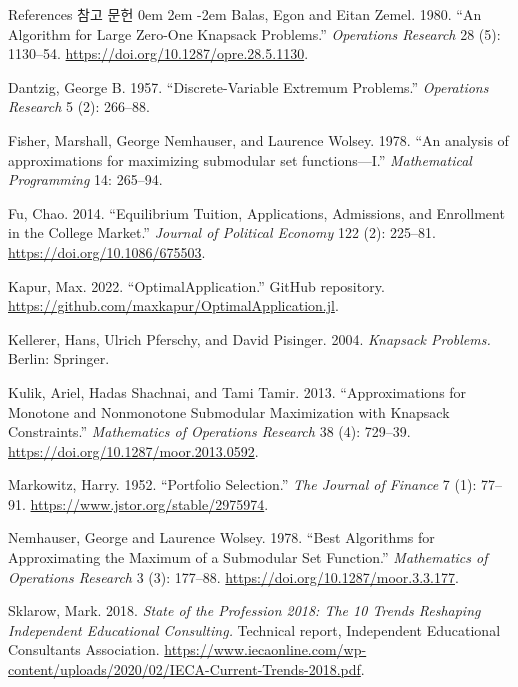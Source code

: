 \documentclass[11pt,mathserif,notheorems]{beamer}
\theoremstyle{definition}
\theoremstyle{definition}
\begin{document}
\begin{frame}[allowframebreaks]{\ifen References \else 참고 문헌 \fi}
\parskip 0em
\leftskip 2em
\parindent -2em
Balas, Egon and Eitan Zemel. 1980. ``An Algorithm for Large Zero-One Knapsack Problems.'' \emph{Operations Research} 28 (5): 1130--54. \url{https://doi.org/10.1287/opre.28.5.1130}. 

Dantzig, George B. 1957. ``Discrete-Variable Extremum Problems.'' \emph{Operations Research} 5 (2): 266--88.

Fisher, Marshall, George Nemhauser, and Laurence Wolsey. 1978. ``An analysis of approximations for maximizing submodular set functions—I.'' \emph{Mathematical Programming} 14: 265--94. 

Fu, Chao. 2014. ``Equilibrium Tuition, Applications, Admissions, and Enrollment in the College Market.'' \emph{Journal of Political Economy} 122 (2): 225--81. \url{https://doi.org/10.1086/675503}. 

Kapur, Max. 2022. ``OptimalApplication.'' GitHub repository. \url{https://github.com/maxkapur/OptimalApplication.jl}.


\framebreak

Kellerer, Hans, Ulrich Pferschy, and David Pisinger. 2004. \emph{Knapsack Problems.} Berlin: Springer.

Kulik, Ariel, Hadas Shachnai, and Tami Tamir. 2013. ``Approximations for Monotone and Nonmonotone Submodular Maximization with Knapsack Constraints.'' \emph{Mathematics of Operations Research} 38 (4): 729--39. \url{https://doi.org/10.1287/moor.2013.0592}.

Markowitz, Harry. 1952. ``Portfolio Selection.'' \emph{The Journal of Finance} 7 (1): 77--91. \url{https://www.jstor.org/stable/2975974}.

Nemhauser, George and Laurence Wolsey. 1978. ``Best Algorithms for Approximating the Maximum of a Submodular Set Function.'' \emph{Mathematics of Operations Research} 3 (3): 177--88. \url{https://doi.org/10.1287/moor.3.3.177}.


Sklarow, Mark. 2018. \emph{State of the Profession 2018: The 10 Trends Reshaping Independent Educational Consulting.} Technical report, Independent Educational Consultants Association. \url{https://www.iecaonline.com/wp-content/uploads/2020/02/IECA-Current-Trends-2018.pdf}.

\end{frame}
\end{document}
